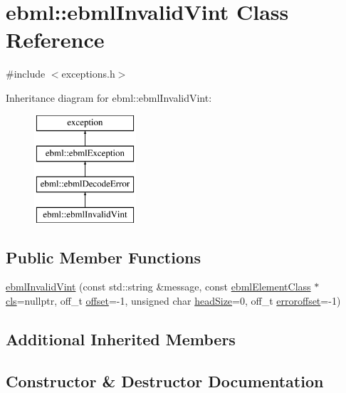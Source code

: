 \hypertarget{classebml_1_1ebmlInvalidVint}{}\section{ebml\+:\+:ebml\+Invalid\+Vint Class Reference}
\label{classebml_1_1ebmlInvalidVint}


{\ttfamily \#include $<$exceptions.\+h$>$}

Inheritance diagram for ebml\+:\+:ebml\+Invalid\+Vint\+:\begin{figure}[H]
\begin{center}
\leavevmode
\includegraphics[height=4.000000cm]{classebml_1_1ebmlInvalidVint}
\end{center}
\end{figure}
\subsection*{Public Member Functions}
\begin{DoxyCompactItemize}
\item 
\mbox{\hyperlink{classebml_1_1ebmlInvalidVint_a8d8c4cbe43a5b4ab6d313a29f8249125}{ebml\+Invalid\+Vint}} (const std\+::string \&message, const \mbox{\hyperlink{classebml_1_1ebmlElementClass}{ebml\+Element\+Class}} $\ast$\mbox{\hyperlink{classebml_1_1ebmlDecodeError_a3568b4ea3cd5bd16b9510abfe269920f}{cls}}=nullptr, off\+\_\+t \mbox{\hyperlink{classebml_1_1ebmlDecodeError_ad32ac9b3dd52f1c11479085d9c665e0f}{offset}}=-\/1, unsigned char \mbox{\hyperlink{classebml_1_1ebmlDecodeError_a61a4d4856f0c779a1c216e45dc5a7c1e}{head\+Size}}=0, off\+\_\+t \mbox{\hyperlink{classebml_1_1ebmlDecodeError_acb525117e0109d9640fb5e8c546e9a02}{erroroffset}}=-\/1)
\end{DoxyCompactItemize}
\subsection*{Additional Inherited Members}


\subsection{Constructor \& Destructor Documentation}
\mbox{\label{classebml_1_1ebmlInvalidVint_a8d8c4cbe43a5b4ab6d313a29f8249125}} 
